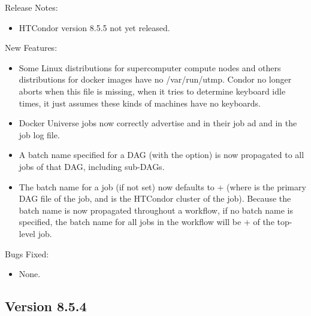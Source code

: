 \noindent Release Notes:

\begin{itemize}

\item HTCondor version 8.5.5 not yet released.

\end{itemize}


\noindent New Features:

\begin{itemize}

\item Some Linux distributions for supercomputer compute nodes and
others distributions for docker images have no /var/run/utmp.  Condor no longer
aborts when this file is missing, when it tries to determine keyboard
idle times, it just assumes these kinds of machines have no keyboards.

\item Docker Universe jobs now correctly advertise 
and  in their job ad and in the job log file.

\item A batch name specified for a DAG (with the 
 option) is now propagated to all jobs of that DAG,
including sub-DAGs.

\item The batch name for a  job (if not set) now
defaults to + (where 
is the primary DAG file of the  job, and 
is the HTCondor cluster of the  job).
Because the batch name is now propagated throughout a workflow, if
no batch name is specified, the batch name for all jobs in the
workflow will be + of the top-level
 job.

\end{itemize}

\noindent Bugs Fixed:

\begin{itemize}

\item None.

\end{itemize}

\subsection*{\label{sec:New-8-5-4}Version 8.5.4}


